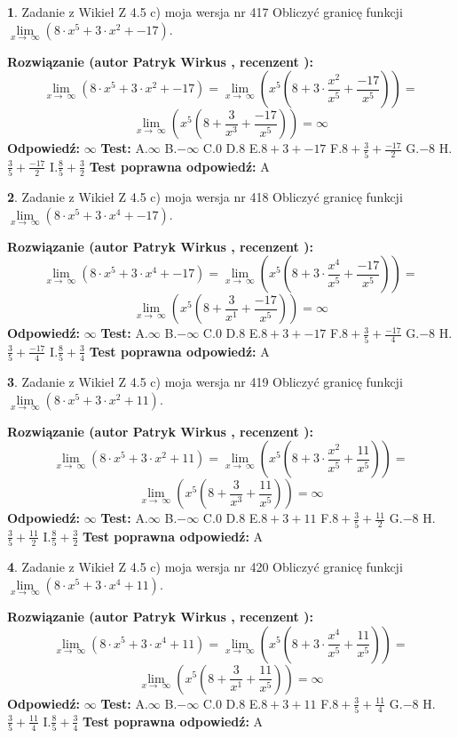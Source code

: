 \documentclass[12pt, a4paper]{article}
\theoremstyle{definition} %
\newtheorem{zad}{}
\newcommand{\zadStart}[1]{\begin{zad}#1\newline}
\newcommand{\zadStop}{\end{zad}}
\newcommand{\rozwStart}[2]{\noindent \textbf{Rozwiązanie (autor #1 , recenzent #2): }\newline}
\newcommand{\rozwStop}{\newline}
\newcommand{\odpStart}{\noindent \textbf{Odpowiedź:}\newline}
\newcommand{\odpStop}{\newline}
\newcommand{\testStart}{\noindent \textbf{Test:}\newline}
\newcommand{\testStop}{\newline}
\newcommand{\kluczStart}{\noindent \textbf{Test poprawna odpowiedź:}\newline}
\newcommand{\kluczStop}{\newline}
\begin{document}
\zadStart{Zadanie z Wikieł Z 4.5 c) moja wersja nr 417}
Obliczyć granicę funkcji  $\lim\limits_{x\to\ \infty}(8 \cdot x^{5}+3 \cdot x^{2}+-17)$.
\zadStop
\rozwStart{Patryk Wirkus}{}
$$\lim\limits_{x\to\ \infty}(8 \cdot x^{5}+3 \cdot x^{2}+-17) = \lim\limits_{x\to\ \infty}(x^{5}(8 +3 \cdot \frac{x^{2}}{x^{5}}+\frac{-17}{x^{5}})) =$$ $$\lim\limits_{x\to\ \infty}(x^{5}(8 +\frac{3}{x^{3}}+\frac{-17}{x^{5}})) =\infty$$
\rozwStop
\odpStart
$\infty$
\odpStop
\testStart
A.$\infty$ B.$-\infty$ C.$0$ D.$8$ E.$8 + 3 + -17$
F.$8+\frac{3}{5}+\frac{-17}{2}$ G.$-8$
H.$\frac{3}{5}+\frac{-17}{2}$
I.$\frac{8}{5}+\frac{3}{2}$
\testStop
\kluczStart
A
\kluczStop



\zadStart{Zadanie z Wikieł Z 4.5 c) moja wersja nr 418}
Obliczyć granicę funkcji  $\lim\limits_{x\to\ \infty}(8 \cdot x^{5}+3 \cdot x^{4}+-17)$.
\zadStop
\rozwStart{Patryk Wirkus}{}
$$\lim\limits_{x\to\ \infty}(8 \cdot x^{5}+3 \cdot x^{4}+-17) = \lim\limits_{x\to\ \infty}(x^{5}(8 +3 \cdot \frac{x^{4}}{x^{5}}+\frac{-17}{x^{5}})) =$$ $$\lim\limits_{x\to\ \infty}(x^{5}(8 +\frac{3}{x^{1}}+\frac{-17}{x^{5}})) =\infty$$
\rozwStop
\odpStart
$\infty$
\odpStop
\testStart
A.$\infty$ B.$-\infty$ C.$0$ D.$8$ E.$8 + 3 + -17$
F.$8+\frac{3}{5}+\frac{-17}{4}$ G.$-8$
H.$\frac{3}{5}+\frac{-17}{4}$
I.$\frac{8}{5}+\frac{3}{4}$
\testStop
\kluczStart
A
\kluczStop



\zadStart{Zadanie z Wikieł Z 4.5 c) moja wersja nr 419}
Obliczyć granicę funkcji  $\lim\limits_{x\to\ \infty}(8 \cdot x^{5}+3 \cdot x^{2}+11)$.
\zadStop
\rozwStart{Patryk Wirkus}{}
$$\lim\limits_{x\to\ \infty}(8 \cdot x^{5}+3 \cdot x^{2}+11) = \lim\limits_{x\to\ \infty}(x^{5}(8 +3 \cdot \frac{x^{2}}{x^{5}}+\frac{11}{x^{5}})) =$$ $$\lim\limits_{x\to\ \infty}(x^{5}(8 +\frac{3}{x^{3}}+\frac{11}{x^{5}})) =\infty$$
\rozwStop
\odpStart
$\infty$
\odpStop
\testStart
A.$\infty$ B.$-\infty$ C.$0$ D.$8$ E.$8 + 3 + 11$
F.$8+\frac{3}{5}+\frac{11}{2}$ G.$-8$
H.$\frac{3}{5}+\frac{11}{2}$
I.$\frac{8}{5}+\frac{3}{2}$
\testStop
\kluczStart
A
\kluczStop



\zadStart{Zadanie z Wikieł Z 4.5 c) moja wersja nr 420}
Obliczyć granicę funkcji  $\lim\limits_{x\to\ \infty}(8 \cdot x^{5}+3 \cdot x^{4}+11)$.
\zadStop
\rozwStart{Patryk Wirkus}{}
$$\lim\limits_{x\to\ \infty}(8 \cdot x^{5}+3 \cdot x^{4}+11) = \lim\limits_{x\to\ \infty}(x^{5}(8 +3 \cdot \frac{x^{4}}{x^{5}}+\frac{11}{x^{5}})) =$$ $$\lim\limits_{x\to\ \infty}(x^{5}(8 +\frac{3}{x^{1}}+\frac{11}{x^{5}})) =\infty$$
\rozwStop
\odpStart
$\infty$
\odpStop
\testStart
A.$\infty$ B.$-\infty$ C.$0$ D.$8$ E.$8 + 3 + 11$
F.$8+\frac{3}{5}+\frac{11}{4}$ G.$-8$
H.$\frac{3}{5}+\frac{11}{4}$
I.$\frac{8}{5}+\frac{3}{4}$
\testStop
\kluczStart
A
\kluczStop
\end{document}
